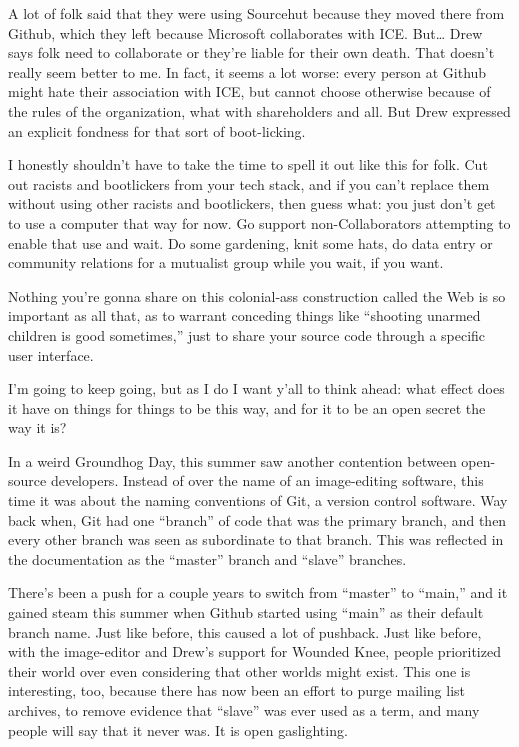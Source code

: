 \documentclass[11pt]{article}
\begin{document}
\begin{itemize}
A lot of folk said that they were using Sourcehut because they moved there from Github, which they left because Microsoft collaborates with ICE. But… Drew says folk need to collaborate or they’re liable for their own death. That doesn’t really seem better to me. In fact, it seems a lot worse: every person at Github might hate their association with ICE, but cannot choose otherwise because of the rules of the organization, what with shareholders and all. But Drew expressed an explicit fondness for that sort of boot-licking.

I honestly shouldn’t have to take the time to spell it out like this for folk. Cut out racists and bootlickers from your tech stack, and if you can’t replace them without using other racists and bootlickers, then guess what: you just don’t get to use a computer that way for now. Go support non-Collaborators attempting to enable that use and wait. Do some gardening, knit some hats, do data entry or community relations for a mutualist group while you wait, if you want.

Nothing you’re gonna share on this colonial-ass construction called the Web is so important as all that, as to warrant conceding things like “shooting unarmed children is good sometimes,” just to share your source code through a specific user interface.

I’m going to keep going, but as I do I want y’all to think ahead: what effect does it have on things for things to be this way, and for it to be an open secret the way it is?

In a weird Groundhog Day, this summer saw another contention between open-source developers. Instead of over the name of an image-editing software, this time it was about the naming conventions of Git, a version control software. Way back when, Git had one “branch” of code that was the primary branch, and then every other branch was seen as subordinate to that branch. This was reflected in the documentation as the “master” branch and “slave” branches.

There’s been a push for a couple years to switch from “master” to “main,” and it gained steam this summer when Github started using “main” as their default branch name. Just like before, this caused a lot of pushback. Just like before, with the image-editor and Drew’s support for Wounded Knee, people prioritized their world over even considering that other worlds might exist. This one is interesting, too, because there has now been an effort to purge mailing list archives, to remove evidence that “slave” was ever used as a term, and many people will say that it never was. It is open gaslighting.


\end{itemize}
\end{document}
